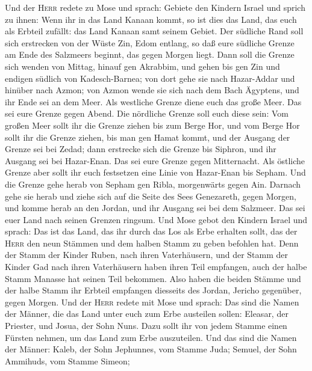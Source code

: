  Und der \textsc{Herr} redete zu Mose und sprach: Gebiete
den Kindern Israel und sprich zu ihnen:  Wenn ihr in das
Land Kanaan kommt, so ist dies das Land, das euch als Erbteil zufällt:
das Land Kanaan samt seinem Gebiet.  Der südliche Rand
soll sich erstrecken von der Wüste Zin, Edom entlang, so daß eure
südliche Grenze am Ende des Salzmeers beginnt, das gegen Morgen liegt.
 Dann soll die Grenze sich wenden von Mittag, hinauf gen
Akrabbim, und gehen bis gen Zin und endigen südlich von Kadesch-Barnea;
von dort gehe sie nach Hazar-Addar und hinüber nach Azmon;
 von Azmon wende sie sich nach dem Bach Ägyptens, und ihr
Ende sei an dem Meer.  Als westliche Grenze diene euch das
große Meer. Das sei eure Grenze gegen Abend.  Die
nördliche Grenze soll euch diese sein: Vom großen Meer sollt ihr die
Grenze ziehen bis zum Berge Hor,  und vom Berge Hor sollt
ihr die Grenze ziehen, bis man gen Hamat kommt, und der Ausgang der
Grenze sei bei Zedad;  dann erstrecke sich die Grenze bis
Siphron, und ihr Ausgang sei bei Hazar-Enan. Das sei eure Grenze gegen
Mitternacht.  Als östliche Grenze aber sollt ihr euch
festsetzen eine Linie von Hazar-Enan bis Sepham.  Und die
Grenze gehe herab von Sepham gen Ribla, morgenwärts gegen Ain. Darnach
gehe sie herab und ziehe sich auf die Seite des Sees Genezareth, gegen
Morgen,  und komme herab an den Jordan, und ihr Ausgang
sei bei dem Salzmeer. Das sei euer Land nach seinen Grenzen ringsum.
 Und Mose gebot den Kindern Israel und sprach: Das ist
das Land, das ihr durch das Los als Erbe erhalten sollt, das der
\textsc{Herr} den neun Stämmen und dem halben Stamm zu geben befohlen
hat.  Denn der Stamm der Kinder Ruben, nach ihren
Vaterhäusern, und der Stamm der Kinder Gad nach ihren Vaterhäusern haben
ihren Teil empfangen, auch der halbe Stamm Manasse hat seinen Teil
bekommen.  Also haben die beiden Stämme und der halbe
Stamm ihr Erbteil empfangen diesseits des Jordan, Jericho gegenüber,
gegen Morgen.  Und der \textsc{Herr} redete mit Mose und
sprach:  Das sind die Namen der Männer, die das Land
unter euch zum Erbe austeilen sollen: Eleasar, der Priester, und Josua,
der Sohn Nuns.  Dazu sollt ihr von jedem Stamme einen
Fürsten nehmen, um das Land zum Erbe auszuteilen.  Und
das sind die Namen der Männer: Kaleb, der Sohn Jephunnes, vom Stamme
Juda;  Semuel, der Sohn Ammihuds, vom Stamme Simeon;
